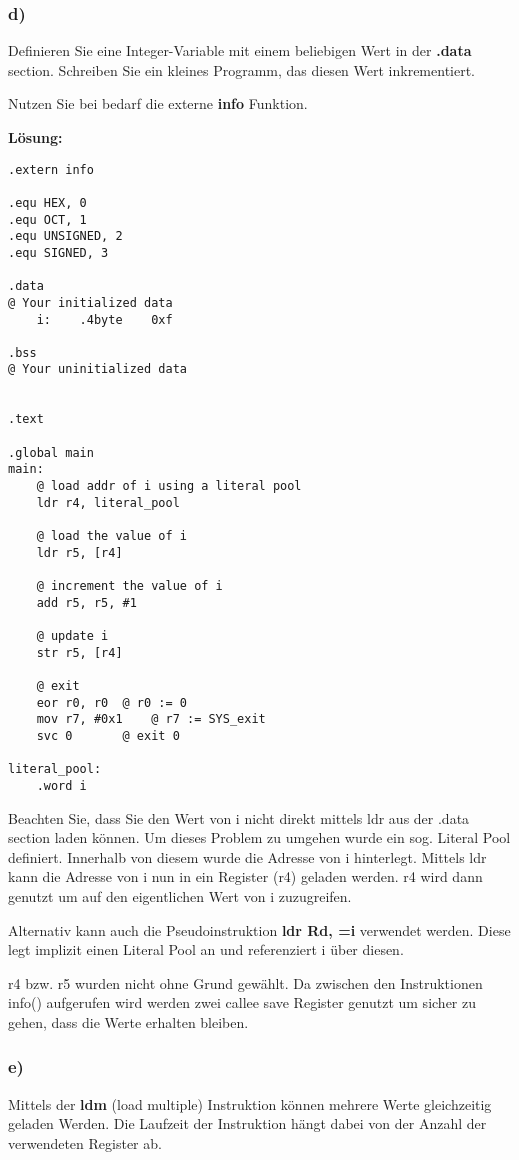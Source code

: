 \documentclass[12pt]{article}
\begin{document}
\subsubsection{d)}
Definieren Sie eine Integer-Variable mit einem beliebigen Wert in der \textbf{.data} section.
Schreiben Sie ein kleines Programm, das diesen Wert inkrementiert. 

Nutzen Sie bei bedarf die externe \textbf{info} Funktion.

\textbf{Lösung:}
\begin{lstlisting}
.extern info

.equ HEX, 0
.equ OCT, 1
.equ UNSIGNED, 2
.equ SIGNED, 3

.data
@ Your initialized data
	i:    .4byte	0xf

.bss
@ Your uninitialized data


.text

.global main
main:
	@ load addr of i using a literal pool
	ldr r4, literal_pool
	
	@ load the value of i
	ldr r5, [r4]
	
	@ increment the value of i
	add r5, r5, #1

	@ update i
	str r5, [r4]

	@ exit
	eor r0, r0	@ r0 := 0
	mov r7, #0x1	@ r7 := SYS_exit
	svc 0		@ exit 0

literal_pool:
	.word i
\end{lstlisting}
Beachten Sie, dass Sie den Wert von i nicht direkt mittels ldr aus der .data section laden können.
Um dieses Problem zu umgehen wurde ein sog. Literal Pool definiert. Innerhalb von diesem wurde die Adresse
von i hinterlegt. Mittels ldr kann die Adresse von i nun in ein Register (r4) geladen werden. r4 wird
dann genutzt um auf den eigentlichen Wert von i zuzugreifen.

Alternativ kann auch die Pseudoinstruktion \textbf{ldr Rd, =i} verwendet werden. Diese legt implizit einen Literal Pool an und
referenziert i über diesen.

r4 bzw. r5 wurden nicht ohne Grund gewählt. Da zwischen den Instruktionen info() aufgerufen wird werden zwei callee save Register
genutzt um sicher zu gehen, dass die Werte erhalten bleiben.


\subsubsection{e)}
Mittels der \textbf{ldm} (load multiple) Instruktion können mehrere Werte gleichzeitig geladen Werden. Die Laufzeit der Instruktion hängt
dabei von der Anzahl der verwendeten Register ab.
\end{document}
